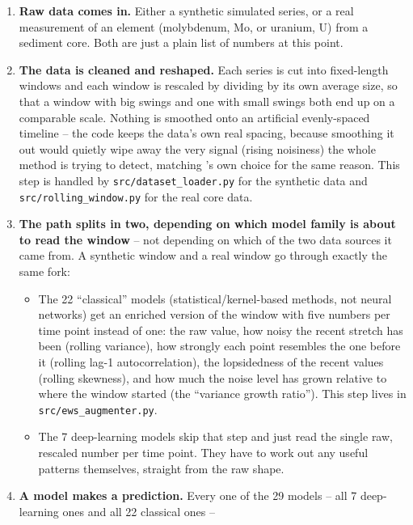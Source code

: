\begin{enumerate}
    \item \textbf{Raw data comes in.} Either a synthetic simulated series,
    or a real measurement of an element (molybdenum, Mo, or uranium, U)
    from a sediment core. Both are just a plain list of numbers at this
    point.
    \item \textbf{The data is cleaned and reshaped.} Each series is cut
    into fixed-length windows and each window is rescaled by dividing by
    its own average size, so that a window with big swings and one with
    small swings both end up on a comparable scale. Nothing is smoothed
    onto an artificial evenly-spaced timeline -- the code keeps the
    data's own real spacing, because smoothing it out would quietly wipe
    away the very signal (rising noisiness) the whole method is trying to
    detect, matching \citet{bury2021}'s own choice for the same reason.
    This step is handled by \texttt{src/dataset\_loader.py} for the
    synthetic data and \texttt{src/rolling\_window.py} for the real core
    data.
    \item \textbf{The path splits in two, depending on which model
    family is about to read the window} -- not depending on which of the
    two data sources it came from. A synthetic window and a real window
    go through exactly the same fork:
    \begin{itemize}
        \item The 22 ``classical'' models (statistical/kernel-based
        methods, not neural networks) get an enriched version of the
        window with five numbers per time point instead of one: the raw
        value, how noisy the recent stretch has been (rolling variance),
        how strongly each point resembles the one before it (rolling
        lag-1 autocorrelation), the lopsidedness of the recent values
        (rolling skewness), and how much the noise level has grown
        relative to where the window started (the ``variance growth
        ratio''). This step lives in \texttt{src/ews\_augmenter.py}.
        \item The 7 deep-learning models skip that step and just read
        the single raw, rescaled number per time point. They have to
        work out any useful patterns themselves, straight from the raw
        shape.
    \end{itemize}
    \item \textbf{A model makes a prediction.} Every one of the 29
    models -- all 7 deep-learning ones and all 22 classical ones --

\end{enumerate}
